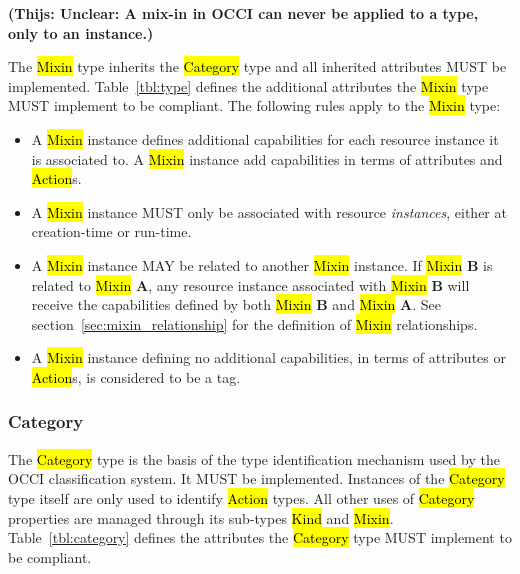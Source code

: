 \documentclass[10pt,a4paper]{article}
\begin{document}
\textbf{(Thijs: Unclear: A mix-in in OCCI can never be applied to a type, only to an instance.)}

The \hl{Mixin} type inherits the \hl{Category} type and all inherited
attributes MUST be implemented. Table~\ref{tbl:type} defines the
additional attributes the \hl{Mixin} type MUST implement to be compliant.
The following rules apply to the \hl{Mixin} type:
\begin{itemize}
\item A \hl{Mixin} instance defines additional capabilities for each
 resource instance it is associated to. A \hl{Mixin} instance
 add capabilities in terms of attributes and \hl{Action}s.
\item A \hl{Mixin} instance MUST only be associated with resource
 {\em instances}, either at creation-time or run-time.
\item A \hl{Mixin} instance MAY be related to another \hl{Mixin} instance.
 If \hl{Mixin} {\bf B} is related to \hl{Mixin} {\bf A}, any resource instance
 associated with \hl{Mixin} {\bf B} will receive the capabilities defined by
 both \hl{Mixin} {\bf B} and \hl{Mixin} {\bf A}.
 See section~\ref{sec:mixin_relationship} for the definition of \hl{Mixin}
 relationships.
\item A \hl{Mixin} instance defining no additional capabilities, in terms
 of attributes or \hl{Action}s, is considered to be a tag.
\end{itemize}

\subsubsection{Category}
\label{sec:category}
The \hl{Category} type is the basis of the type identification mechanism used by the
OCCI classification system. It MUST be implemented. Instances of the
\hl{Category} type itself are only used to identify \hl{Action} types. All
other uses of \hl{Category} properties are managed through its sub-types
\hl{Kind} and \hl{Mixin}.
%
Table~\ref{tbl:category} defines the attributes the \hl{Category} type MUST
implement to be compliant.
\end{document}

